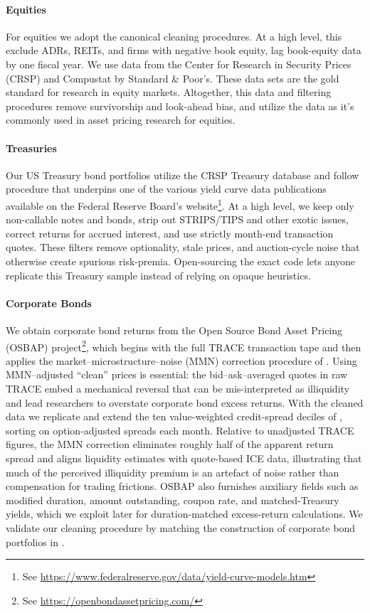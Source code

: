 \documentclass{article}
\begin{document}
\paragraph{Equities}
For equities we adopt the canonical \cite{Fama1993} cleaning procedures. At a high level, this exclude ADRs, REITs, and firms with negative book equity, lag book-equity data by one fiscal year. We use data from the Center for Research in Security Prices (CRSP) and Compustat by Standard \& Poor's. These data sets
are the gold standard for research in equity markets. Altogether, this data and filtering procedures remove survivorship and look-ahead bias, and utilize the data as it's commonly used in asset pricing research for equities.


\paragraph{Treasuries} Our US Treasury bond portfolios utilize the CRSP Treasury database and follow \cite{Gurkaynak2007} procedure that underpins one of the
various yield curve data publications available on the Federal Reserve Board's website\footnote{See \url{https://www.federalreserve.gov/data/yield-curve-models.htm}}. At a high level, we keep only non-callable notes and bonds, strip out STRIPS/TIPS and other exotic issues, correct returns for accrued interest, and use strictly month-end transaction quotes. These filters remove optionality, stale prices, and auction-cycle noise that otherwise create spurious risk-premia. Open-sourcing the exact code lets anyone replicate this Treasury sample instead of relying on opaque heuristics.


\paragraph{Corporate Bonds}
We obtain corporate bond returns from the Open Source Bond Asset Pricing (OSBAP) project\footnote{See \url{https://openbondassetpricing.com/}}, which begins with the full TRACE transaction tape and then applies the market--microstructure--noise (MMN) correction procedure of \citet{Dickerson2024}.  Using MMN--adjusted ``clean'' prices is essential: the bid--ask--averaged quotes in raw TRACE embed a mechanical reversal that can be mis-interpreted as illiquidity and lead researchers to overstate corporate bond excess returns.  With the cleaned data we replicate and extend the ten value-weighted credit-spread deciles of \citet{Nozawa2017}, sorting on option-adjusted spreads each month.  Relative to unadjusted TRACE figures, the MMN correction eliminates roughly half of the apparent return spread and aligns liquidity estimates with quote-based ICE data, illustrating that much of the perceived illiquidity premium is an artefact of noise rather than compensation for trading frictions.  OSBAP also furnishes auxiliary fields such as modified duration, amount outstanding, coupon rate, and matched-Treasury yields, which we exploit later for duration-matched excess-return calculations. We validate our cleaning procedure by matching the construction of corporate bond portfolios in \cite{He2017}.
\end{document}
